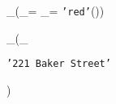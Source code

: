
\pi_{\sid}(\Catalog \Join_{\pid = \pid} \sigma_{\mycolor = \texttt{'red'}}(\Parts))

\cup

\pi_{\sid}(\sigma_{\address = \texttt{'221 Baker Street'}}\Suppliers)
